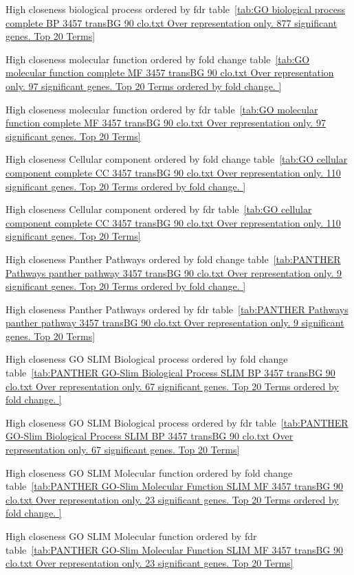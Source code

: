High closeness biological process  ordered by fdr table~\ref{tab:GO biological process complete BP 3457 transBG 90 clo.txt Over representation only. 877 significant genes. Top 20 Terms}

High closeness molecular function ordered by fold change table~\ref{tab:GO molecular function complete MF 3457 transBG 90 clo.txt Over representation only. 97 significant genes. Top 20 Terms ordered by fold change. }
 

High closeness molecular function ordered by fdr table~\ref{tab:GO molecular function complete MF 3457 transBG 90 clo.txt Over representation only. 97 significant genes. Top 20 Terms}

High closeness Cellular component ordered by fold change table~\ref{tab:GO cellular component complete CC 3457 transBG 90 clo.txt Over representation only. 110 significant genes. Top 20 Terms ordered by fold change. }


High closeness Cellular component ordered by fdr table~\ref{tab:GO cellular component complete CC 3457 transBG 90 clo.txt Over representation only. 110 significant genes. Top 20 Terms}


High closeness Panther Pathways ordered by fold change table~\ref{tab:PANTHER Pathways panther pathway 3457 transBG 90 clo.txt Over representation only. 9 significant genes. Top 20 Terms ordered by fold change. }
 

High closeness Panther Pathways ordered by fdr table~\ref{tab:PANTHER Pathways panther pathway 3457 transBG 90 clo.txt Over representation only. 9 significant genes. Top 20 Terms}


High closeness GO SLIM Biological process ordered by fold change table~\ref{tab:PANTHER GO-Slim Biological Process SLIM BP 3457 transBG 90 clo.txt Over representation only. 67 significant genes. Top 20 Terms ordered by fold change. }


High closeness GO SLIM Biological process ordered by fdr table~\ref{tab:PANTHER GO-Slim Biological Process SLIM BP 3457 transBG 90 clo.txt Over representation only. 67 significant genes. Top 20 Terms}



High closeness GO SLIM Molecular function ordered by fold change table~\ref{tab:PANTHER GO-Slim Molecular Function SLIM MF 3457 transBG 90 clo.txt Over representation only. 23 significant genes. Top 20 Terms ordered by fold change. }



High closeness GO SLIM Molecular function ordered by fdr table~\ref{tab:PANTHER GO-Slim Molecular Function SLIM MF 3457 transBG 90 clo.txt Over representation only. 23 significant genes. Top 20 Terms}



